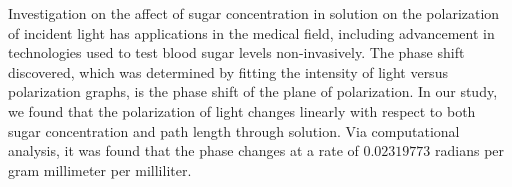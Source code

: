 Investigation on the affect of sugar concentration in solution on the polarization of incident light has applications in the medical field, including advancement in technologies used to test blood sugar levels non-invasively. The phase shift discovered, which was determined by fitting the intensity of light versus polarization graphs, is the phase shift of the plane of polarization. In our study, we found that the polarization of light changes linearly with respect to both sugar concentration and path length through solution. Via computational analysis, it was found that the phase changes at a rate of $0.02319773$ radians per gram millimeter per milliliter.